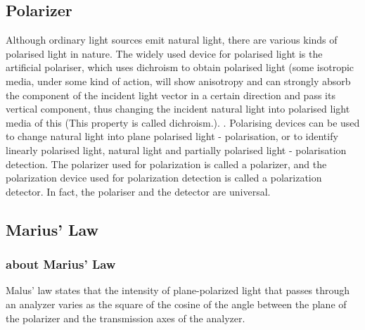 \documentclass[UTF8]{article}
\begin{document}
	\subsection{Polarizer}
	Although ordinary light sources emit natural light, there are various kinds of polarised light in nature. The widely used device for polarised light is the artificial polariser, which uses dichroism to obtain polarised light (some isotropic media, under some kind of action, will show anisotropy and can strongly absorb the component of the incident light vector in a certain direction and pass its vertical component, thus changing the incident natural light into polarised light media of this (This property is called dichroism.). . Polarising devices can be used to change natural light into plane polarised light - polarisation, or to identify linearly polarised light, natural light and partially polarised light - polarisation detection. The polarizer used for polarization is called a polarizer, and the polarization device used for polarization detection is called a polarization detector. In fact, the polariser and the detector are universal.
	\subsection{Marius' Law}
	\subsubsection{about Marius' Law}
	Malus’ law states that the intensity of plane-polarized light that passes through an analyzer varies as the square of the cosine of the angle between the plane of the polarizer and the transmission axes of the analyzer.
\end{document}
